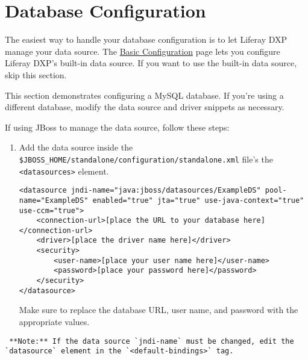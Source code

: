 \section{Database Configuration}\label{database-configuration}

The easiest way to handle your database configuration is to let Liferay
DXP manage your data source. The
\href{/docs/7-2/deploy/-/knowledge_base/d/preparing-for-install\#using-the-built-in-data-source}{Basic
Configuration} page lets you configure Liferay DXP's built-in data
source. If you want to use the built-in data source, skip this section.

This section demonstrates configuring a MySQL database. If you're using
a different database, modify the data source and driver snippets as
necessary.

If using JBoss to manage the data source, follow these steps:

\begin{enumerate}
\def\labelenumi{\arabic{enumi}.}
\item
  Add the data source inside the
  \texttt{\$JBOSS\_HOME/standalone/configuration/standalone.xml} file's
  the \texttt{\textless{}datasources\textgreater{}} element.

\begin{verbatim}
<datasource jndi-name="java:jboss/datasources/ExampleDS" pool-name="ExampleDS" enabled="true" jta="true" use-java-context="true" use-ccm="true">
    <connection-url>[place the URL to your database here]</connection-url>
    <driver>[place the driver name here]</driver>
    <security>
        <user-name>[place your user name here]</user-name>
        <password>[place your password here]</password>
    </security>
</datasource>
\end{verbatim}

  Make sure to replace the database URL, user name, and password with
  the appropriate values.
\end{enumerate}

\noindent\hrulefill

\begin{verbatim}
 **Note:** If the data source `jndi-name` must be changed, edit the `datasource` element in the `<default-bindings>` tag.
\end{verbatim}

\noindent\hrulefill

